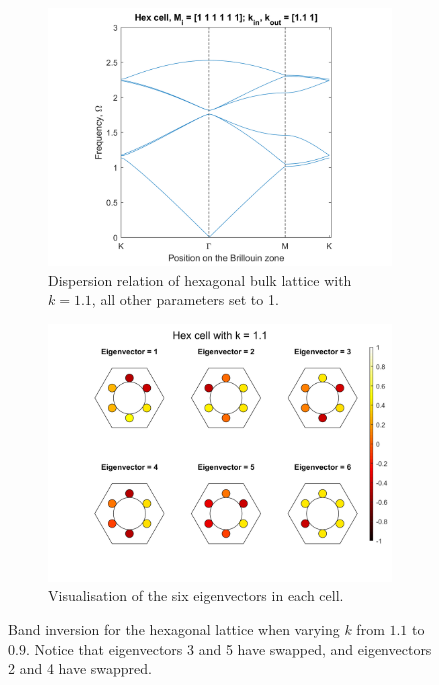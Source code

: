 \begin{figure}
\medskip
\begin{subfigure}[b]{.5\textwidth}
  \centering
  \includegraphics[width=1\linewidth]{imgs/hexinvdispermore.png}
  \caption{Dispersion relation of hexagonal bulk lattice with $k=1.1$, all
other parameters set to 1.}
  \label{fig:sub1}
\end{subfigure}%
\begin{subfigure}[b]{.5\textwidth}
  \centering
  \includegraphics[width=1\linewidth]{imgs/hexinversionmore.png}
  \caption{Visualisation of the six eigenvectors in each cell.}
  \label{fig:sub2}
\end{subfigure}
\caption{Band inversion for the hexagonal lattice when varying $k$ from $1.1$
to $0.9$. Notice that eigenvectors 3 and 5 have swapped, and eigenvectors 2 and
4 have swappred.}
\label{fig:hexinversion}
\end{figure}

